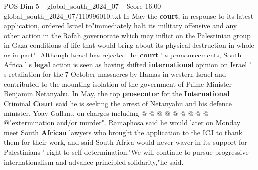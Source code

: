 \begin{textsample}{POS Dim 5 – global\_south\_2024\_07 – Score 16.00 – global\_south\_2024\_07/110996010.txt}
In May the \textbf{court}, in response to its latest application, ordered Israel to"immediately halt its military offensive and any other action in the Rafah governorate which may inflict on the Palestinian group in Gaza conditions of life that would bring about its physical destruction in whole or in part".
Although Israel has rejected the \textbf{court} ' s pronouncements, South Africa ' s \textbf{legal} action is seen as having shifted \textbf{international} opinion on Israel ' s retaliation for the 7 October massacres by Hamas in western Israel and contributed to the mounting isolation of the government of Prime Minister Benjamin Netanyahu.
In May, the top \textbf{prosecutor} for the \textbf{International} Criminal \textbf{Court} said he is seeking the arrest of Netanyahu and his defence minister, Yoav Gallant, on charges including @ @ @ @ @ @ @ @ @ @"extermination and/or murder".
Ramaphosa said he would later on Monday meet South \textbf{African} lawyers who brought the application to the ICJ to thank them for their work, and said South Africa would never waver in its support for Palestinians ' right to self-determination."We will continue to pursue progressive internationalism and advance principled solidarity,"he said.

\end{textsample}
